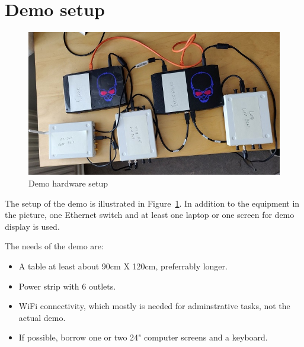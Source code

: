 \documentclass[10pt,emptycopyrightspace]{ewsn-proc}
\begin{document}
%
%


\clearpage
\section{Demo setup}

\begin{figure}[h]
  \centering
	\includegraphics[width= 0.42 \textwidth]{hardware.jpg}
	\caption{Demo hardware setup}
	\label{fig:hardware}
\end{figure}

The setup of the demo is illustrated in Figure~\ref{fig:hardware}.  In
addition to the equipment in the picture, one Ethernet switch and at
least one laptop or one screen for demo display is used.

The needs of the demo are:
\begin{itemize}
  \item A table at least about 90cm X 120cm, preferrably longer.
  \item Power strip with 6 outlets.
  \item WiFi connectivity, which mostly is needed for adminstrative
    tasks, not the actual demo.
  \item If possible, borrow one or two 24" computer screens and a keyboard.
\end{itemize}
\end{document}
